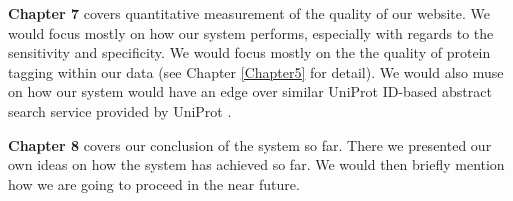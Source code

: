 \textbf{Chapter 7} covers quantitative measurement of the quality of our website. We would focus mostly on how our system performs, especially with regards to the sensitivity and specificity. We would focus mostly on the the quality of protein tagging within our data (see Chapter \ref{Chapter5} for detail). We would also muse on how our system would have an edge over similar UniProt ID-based abstract search service provided by UniProt \citep{uniprot2008universal} \citep{Uniprot2011} \citep{UniprotOnline}.


\textbf{Chapter 8} covers our conclusion of the system so far. There we presented our own ideas on how the system has achieved so far. We would then briefly mention how we are going to proceed in the near future.

